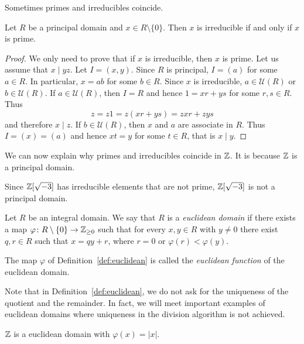 Sometimes primes and irreducibles coincide. 

\begin{proposition}
\label{pro:PID:irreducible=prime}
Let $R$ be a principal domain and $x\in R\setminus\{0\}$.
	Then $x$ is irreducible if and only if $x$ is prime. 	
\end{proposition}

\begin{proof}
	We only need to prove that if $x$ is irreducible, then $x$ is prime. Let us
	assume that $x\mid yz$. Let $I=(x,y)$. Since $R$ is principal, $I=(a)$ for some $a\in R$. In particular, $x=ab$ for some $b\in R$. Since $x$ is irreducible, $a\in\mathcal{U}(R)$ or
	$b\in\mathcal{U}(R)$. If $a\in\mathcal{U}(R)$, then $I=R$ and hence 
	$1=xr+ys$ for some $r,s\in R$. Thus
	\[
	z=z1=z(xr+ys)=zxr+zys
	\]
	and therefore $x\mid z$. If $b\in\mathcal{U}(R)$, then $x$ and $a$ are associate
	in $R$. Thus $I=(x)=(a)$ and hence $xt=y$ for some $t\in R$, that is $x\mid y$.  
\end{proof}

We can now explain why primes and irreducibles coincide in 
$\mathbb{Z}$. It is because $\mathbb{Z}$ is a principal domain.

\begin{example}
	Since $\mathbb{Z}[\sqrt{-3}]$ has irreducible elements that are not prime, 
	$\mathbb{Z}[\sqrt{-3}]$ is not a principal domain.
\end{example}

\begin{definition}
  \label{def:euclidean}
	Let $R$ be an integral domain. We say that $R$ is a \emph{euclidean domain}
	if there exists a map $\varphi\colon R\setminus\{0\}\to\mathbb{Z}_{\geq0}$ such that
	for every $x,y\in R$ with $y\ne 0$ there exist $q,r\in R$ such that 
	$x=qy+r$, where $r=0$ or $\varphi(r)<\varphi(y)$. 
\end{definition}

The map $\varphi$ of Definition~\ref{def:euclidean} is called the 
\emph{euclidean function} of the euclidean domain. 

Note that in Definition~\ref{def:euclidean}, we do not ask for the
uniqueness of the quotient and the remainder. In fact, we will meet important
examples of euclidean domains where uniqueness in the division algorithm is not
achieved. 

\begin{example}
	$\mathbb{Z}$ is a euclidean domain with $\varphi(x)=|x|$.
\end{example}


